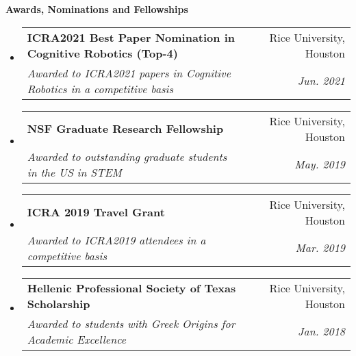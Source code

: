 \documentclass[letterpaper,11pt]{article}
\makeatletter
\newcommand{\resheading}[1]{{\large \colorbox{mygrey}{\begin{minipage}{\textwidth}{\textbf{#1 \vphantom{p\^{E}}}}\end{minipage}}}}
\newcommand{\ressubheading}[4]{
\begin{tabular*}{7.0in}{l@{\extracolsep{\fill}}r}
		\textbf{#1} & #2 \\
		\textit{#3} & \textit{#4} \\
\end{tabular*}\vspace{-6pt}}
\makeatother
\begin{document}
\resheading{Awards, Nominations and Fellowships}
\begin{itemize}
		\item
            \ressubheading{ICRA2021 Best Paper Nomination in Cognitive Robotics (Top-4)}
            {Rice University, Houston}{Awarded to ICRA2021 papers in Cognitive Robotics in a competitive basis}
		{Jun. 2021}
		\item
     	\ressubheading{NSF Graduate Research Fellowship}
     	{Rice University, Houston}{Awarded to outstanding graduate students in the US in STEM }{May. 2019}
		\item
		\ressubheading{ICRA 2019 Travel Grant}
		{Rice University, Houston}{Awarded to ICRA2019 attendees in a competitive basis }{Mar. 2019}
		\item
		\ressubheading{Hellenic Professional Society of Texas Scholarship}
		{Rice University, Houston}{Awarded to students with Greek Origins for Academic Excellence}
		{Jan. 2018}
\end{itemize}

\pagebreak
\end{document}
